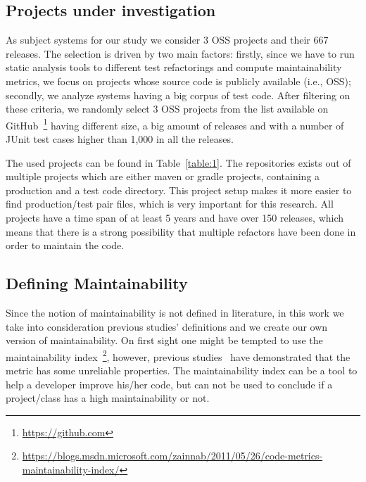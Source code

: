 \subsection{Projects under investigation}
As subject systems for our study we consider 3 OSS projects and their 667 releases. The selection is driven by two main factors: firstly, since we have to run static analysis tools to different test refactorings and compute maintainability metrics, we focus on projects whose source code is publicly available (i.e., OSS); secondly, we analyze systems having a big corpus of test code. After filtering on these criteria, we randomly select 3 OSS projects from the list available on GitHub~\footnote{\url{https://github.com}} having different size, a big amount of releases and with a number of JUnit test cases higher than 1,000 in all the releases.

The used projects can be found in Table~\ref{table:1}. The repositories exists out of multiple projects which are either maven or gradle projects, containing a production and a test code directory. This project setup makes it more easier to find production/test pair files, which is very important for this research. All projects have a time span of at least 5 years and have over 150 releases, which means that there is a strong possibility that multiple refactors have been done in order to maintain the code.


\begin{table}[htb]
    \caption{An overview of the analysed projects}
    \label{table:1}
\end{table}

\subsection{Defining Maintainability}
Since the notion of maintainability is not defined in literature, in this work we take into consideration previous studies' definitions and we create our own version of maintainability. 
On first sight one might be tempted to use the maintainability index~\footnote{\url{https://blogs.msdn.microsoft.com/zainnab/2011/05/26/code-metrics-maintainability-index/}}, however, previous studies~\cite{sjoberg2012questioning, heitlager2007practical} have demonstrated that the metric has some unreliable properties. The maintainability index can be a tool to help a developer improve his/her code, but can not be used to conclude if a project/class has a high maintainability or not. 

